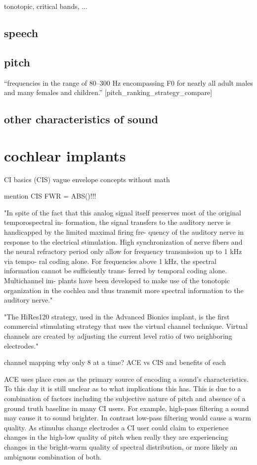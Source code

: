 \documentclass [11pt, proquest] {uwthesis}[2015/03/03]
\begin{document}
tonotopic, critical bands, ...

\subsection{speech}

\subsection{pitch}

``frequencies in the range of 80–300 Hz encompassing F0 for nearly all adult males and many females and children.'' [pitch_ranking_strategy_compare]

\subsection{other characteristics of sound}

\section{cochlear implants}
CI basics (CIS)
vague envelope concepts without math

mention CIS FWR = ABS()!!!

"In spite of the fact that this analog signal itself preserves most of the original temporospectral in- formation, the signal transfers to the auditory nerve is handicapped by the limited maximal firing fre- quency of the auditory nerve in response to the electrical stimulation. High synchronization of nerve fibers and the neural refractory period only allow for frequency transmission up to 1 kHz via tempo- ral coding alone. For frequencies above 1 kHz, the spectral information cannot be sufficiently trans- ferred by temporal coding alone. Multichannel im- plants have been developed to make use of the tonotopic organization in the cochlea and thus transmit more spectral information to the auditory nerve." \cite{somek2006coding}


"The HiRes120 strategy, used in the Advanced Bionics implant, is the first commercial stimulating strategy that uses the virtual channel technique. Virtual channels are created by adjusting the current level ratio of two neighboring electrodes."

channel mapping
	why only 8 at a time?
	ACE vs CIS and benefits of each
	
	
	
	ACE uses place cues as the primary source of encoding a sound's characteristics.  To this day it is still unclear as to what implications this has.  This is due to a combination of factors including the subjective nature of pitch and absence of a ground truth baseline in many CI users.  For example, high-pass filtering a sound may cause it to sound brighter.  In contrast low-pass filtering would cause a warm quality.  As stimulus change electrodes a CI user could claim to experience changes in the high-low quality of pitch when really they are experiencing changes in the bright-warm quality of spectral distribution, or more likely an ambiguous combination of both.
\end{document}
